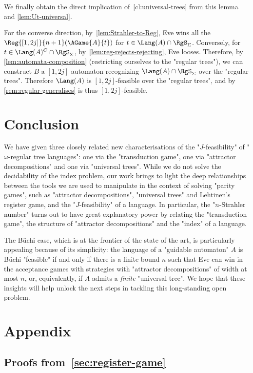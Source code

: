 \documentclass[a4paper,UKenglish,cleveref, autoref, thm-restate]{lipics-v2021}
\newcommand{\A}{{A}}
\begin{document}
We finally obtain the direct implication of~\cref{cl:universal-trees} from this lemma and \cref{lem:Ut-universal}.

For the converse direction, by~\cref{lem:Strahler-to-Reg}, Eve wins all the $\Reg{[1,2j]}{n+1}(\AGame{A}{t})$ for $t\in \Lang(A)\cap \RgS_\Sigma$. Conversely, for $t \in \Lang(A)^C \cap \RgS_\Sigma$, by~\cref{lem:reg-rejects-rejecting}, Eve looses. Therefore, by \cref{lem:automata-composition} (restricting ourselves to the "regular trees"), we can construct $B$ a $[1,2j]$-automaton recognizing $\Lang(A)\cap\RgS_\Sigma$ over the "regular trees". Therefore $\Lang(A)$ is $[1,2j]$-feasible over the "regular trees", and by~ \cref{rem:regular-generalises} is thus $[1,2j]$-feasible. 
\section{Conclusion}
We have given three closely related new characterisations of the "$J$-feasibility" of "$\omega$-regular tree languages": one via the "transduction game", one via "attractor decompositions" and one via "universal trees". While we do not solve the decidability of the index problem, our work brings to light the deep relationships between the tools we are used to manipulate in the context of solving "parity games", such as "attractor decompositions", "universal trees" and Lehtinen's register game, and the "$J$-feasibility" of a language.  In particular, the "$n$-Strahler number" turns out to have great explanatory power by relating the "transduction game", the structure of "attractor decompositions" and the "index" of a language. 

The B\"uchi case, which is at the frontier of the state of the art, is particularly appealing because of its simplicity: the language of a "guidable automaton" $\A$ is B\"uchi "feasible" if and only if there is a finite bound $n$ such that Eve can win in the acceptance games with strategies with "attractor decompositions" of width at most $n$, or, equivalently, if $\A$ admits a \textit{finite} "universal tree". We hope that these insights will help unlock the next steps in tackling this long-standing open problem. 


\appendix

\section{Appendix}




\subsection{Proofs from~\cref{sec:register-game}}
\end{document}
